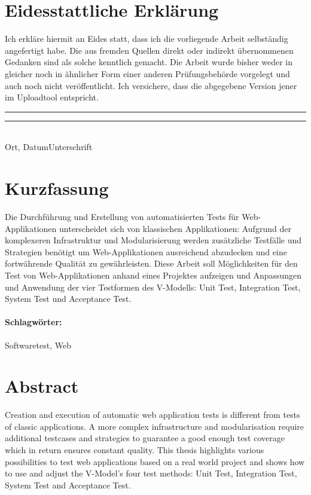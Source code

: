 \documentclass[a4paper,bibtotoc,oneside]{scrbook}
\begin{document}
\newpage


\section*{Eidesstattliche Erklärung}\thispagestyle{empty}
\glqq Ich erkläre hiermit an Eides statt, dass ich die vorliegende Arbeit selbständig angefertigt habe. 
Die aus fremden Quellen direkt oder indirekt übernommenen Gedanken sind als solche kenntlich gemacht. 
Die Arbeit wurde bisher weder in gleicher noch in ähnlicher Form einer anderen Prüfungsbehörde vorgelegt
und auch noch nicht veröffentlicht. Ich versichere, dass die abgegebene Version jener im Uploadtool entspricht.\grqq\\[5\baselineskip]
\rule{5cm}{0.2pt}\hfill\rule{5cm}{0.2pt}\\
\phantom{Datum }Ort, Datum\hfill Unterschrift\hspace{15mm}

\newpage


\section*{Kurzfassung}\thispagestyle{empty}
Die Durchführung und Erstellung von automatisierten Tests für Web-Applikationen unterscheidet sich von klassischen Applikationen: Aufgrund der komplexeren Infrastruktur und Modularisierung werden zusätzliche Testfälle und Strategien benötigt um Web-Applikationen ausreichend abzudecken und eine fortwährende Qualität zu gewährleisten. Diese Arbeit soll Möglichkeiten für den Test von Web-Applikationen anhand eines Projektes aufzeigen und Anpassungen und Anwendung der vier Testformen des V-Modells: Unit Test, Integration Test, System Test und Acceptance Test. 

\vfill
\paragraph*{Schlagwörter:} Softwaretest, Web

\newpage

\section*{Abstract}\thispagestyle{empty}
Creation and execution of automatic web application tests is different from tests of classic applications. A more complex infrastructure and modularisation require additional testcases and strategies to guarantee a good enough test coverage which in return ensures constant quality. This thesis highlights various possibilities to test web applications based on a real world project and shows how to use and adjust the V-Model's four test methods: Unit Test, Integration Test, System Test and Acceptance Test.
\end{document}
